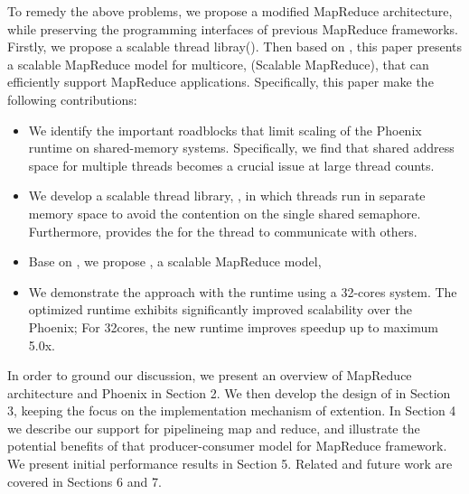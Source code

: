 
To remedy the above problems, we propose a modified MapReduce architecture, while preserving the programming interfaces of previous MapReduce frameworks.
Firstly, we propose a scalable thread libray(\myth).
Then based on \myth, this paper presents a scalable MapReduce model for multicore, \myds(Scalable MapReduce), that can efficiently support MapReduce applications.
Specifically, this paper make the following contributions:
\begin{itemize}
  \item We identify the important roadblocks that limit scaling of the Phoenix runtime on shared-memory systems. Specifically, we find that shared address space for multiple threads becomes a crucial issue at large thread counts.
  
  \item We develop a scalable thread library, \myth, in which threads run in separate memory space to avoid the contention on the single shared semaphore. Furthermore, \myth provides the  for the thread to communicate with others. 

  \item Base on \myth, we propose \myds, a scalable MapReduce model, 

  \item We demonstrate the approach with the \myds runtime using a 32-cores system. The optimized runtime exhibits significantly improved scalability over the Phoenix; For 32cores, the new runtime improves speedup up to maximum 5.0x.
\end{itemize}

In order to ground our discussion, we present an overview
of MapReduce architecture and Phoenix in Section 2. 
We then develop the design of \myth in Section 3, 
keeping the focus on the implementation mechanism of extention. 
In Section 4 we describe our support for pipelineing map and reduce,
and illustrate the potential benefits of that producer-consumer model for MapReduce framework. 
We present initial performance results in Section 5. 
Related and future work are covered in Sections 6 and 7.



